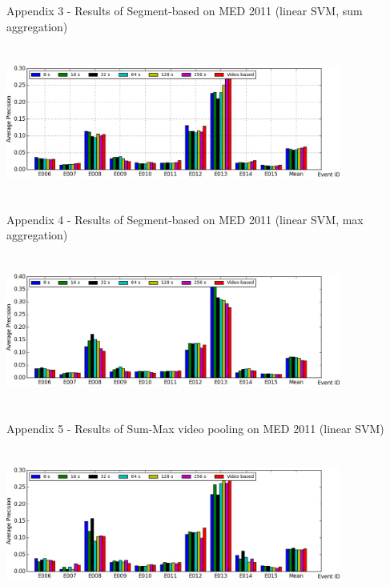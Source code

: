 \documentclass{beamer}
\begin{document}
\begin{frame}{Appendix 3 - Results of Segment-based on MED 2011 (linear SVM, sum aggregation)} 	
	
	\begin{center}
		\includegraphics[width=11cm,height=5cm]{images/part4/sb_linear_sum.png}
	\end{center}
	
\end{frame}	

\begin{frame}{Appendix 4 - Results of Segment-based on MED 2011 (linear SVM, max aggregation)} 	
	
	\begin{center}
		\includegraphics[width=11cm,height=5cm]{images/part4/sb_linear_max.png}
	\end{center}
	
\end{frame}	

\begin{frame}{Appendix 5 - Results of Sum-Max video pooling on MED 2011 (linear SVM)} 	
	
	\begin{center}
		\includegraphics[width=11cm,height=5cm]{images/part4/summax_linear.png}
	\end{center}
	
\end{frame}	
\end{document}
